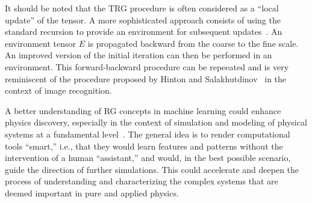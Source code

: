 \documentclass[../main.tex]{subfiles}
\begin{document}
It should be noted that the TRG procedure is often considered as a ``local
update'' of the tensor.
%
A more sophisticated approach consists of using the standard recursion to
provide an environment for subsequent
updates~\cite{PhysRevLett.103.160601,PhysRevB.86.045139}.
%
An environment tensor $E$ is propagated backward from the coarse to the fine
scale.
%
An improved version of the initial iteration can then be performed in an
environment.
%
This forward-backward procedure can be repeeated and is very reminiscent of the
procedure proposed by Hinton and Salakhutdinov~\cite{Hinton504} in the context
of image recognition.

A better understanding of RG concepts in machine learning could enhance physics
discovery, especially in the context of simulation and modeling of physical
systems at a fundamental level~\cite{Shanahan:2018vcv}.
%
The general idea is to render computational tools ``smart,'' i.e., that they
would learn features and patterns without the intervention of a human
``assistant,'' and would, in the best possible scenario, guide the direction of
further simulations.
%
This could accelerate and deepen the process of understanding and
characterizing the complex systems that are deemed important in pure and
applied physics.
\end{document}
